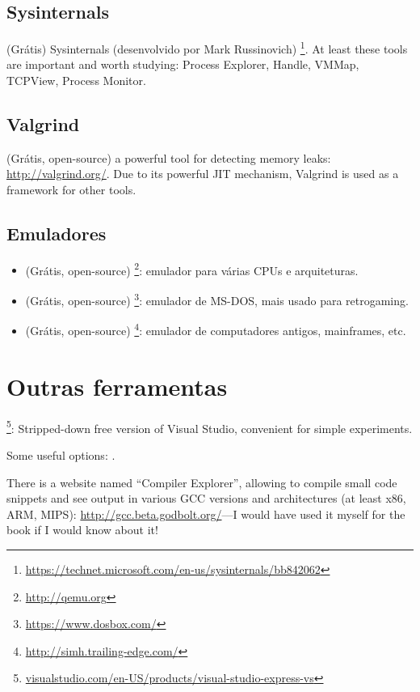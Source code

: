 \subsection{Sysinternals}

(Grátis) Sysinternals (desenvolvido por Mark Russinovich)
\footnote{\url{https://technet.microsoft.com/en-us/sysinternals/bb842062}}.
At least these tools are important and worth studying: Process Explorer, Handle, VMMap, TCPView, Process Monitor.

\subsection{Valgrind}

(Grátis, open-source) a powerful tool for detecting memory leaks: \url{http://valgrind.org/}.
Due to its powerful \ac{JIT} mechanism, Valgrind is used as a framework for other tools.


\subsection{Emuladores}

\begin{itemize}
\item (Grátis, open-source) \footnote{\url{http://qemu.org}}: emulador para várias CPUs e arquiteturas.

\item (Grátis, open-source) \footnote{\url{https://www.dosbox.com/}}: emulador de MS-DOS, mais usado para retrogaming.

\item (Grátis, open-source) \footnote{\url{http://simh.trailing-edge.com/}}: emulador de computadores antigos, mainframes, etc.
\end{itemize}

\section{Outras ferramentas}

\footnote{\href{http://go.yurichev.com/17034}{visualstudio.com/en-US/products/visual-studio-express-vs}}:
Stripped-down free version of Visual Studio, convenient for simple experiments.

Some useful options: .

There is a website named ``Compiler Explorer'', allowing to compile small code snippets and see output
in various GCC versions and architectures
(at least x86, ARM, MIPS): \url{http://gcc.beta.godbolt.org/}---I would have used it myself for the book if I would know about it!

